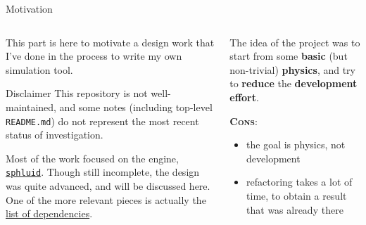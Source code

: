 \documentclass[9pt]{beamer}
\newcommand{\sphluid}{\texttt{sphluid}\xspace}
\begin{document}
\begin{frame}{Motivation}
    \begin{columns}
        \begin{column}{0.5\textwidth}
            This part is here to motivate a design work that I've done in the
            process to write my own simulation tool.

            \vspace*{10pt}
            \begin{center}
            \end{center}


            \vspace*{20pt}
            \begin{alertblock}{Disclaimer}
                This repository is not well-maintained, and some notes
                (including top-level \texttt{README.md}) do not represent the
                most recent status of investigation.

                {\footnotesize
                    Most of the work focused on the engine,
                    \href{https://github.com/AleCandido/sphluid/tree/main/sphluid}{\sphluid}.
                    Though still incomplete, the design was quite advanced, and
                    will be discussed here.
                    One of the more relevant pieces is actually the
                    \href{https://github.com/AleCandido/sphluid/blob/72b9c26eeb969915933ccd50a793b5244255e68a/sphluid/Cargo.toml\#L19-L27}{list
                    of dependencies}.
                }
            \end{alertblock}
        \end{column}
        \begin{column}{0.5\textwidth}
            The idea of the project was to start from some \textbf{basic} (but
            non-trivial) \textbf{physics}, and try to \textbf{reduce} the
            \alert{\textbf{development effort}}.
            \vspace*{30pt}

            \textsc{\color{BrickRed} \textbf{Cons}}:
            \begin{itemize}
                \item the goal is physics, not development
                \item refactoring takes a lot of time, to obtain a result that
                  was already there
            \end{itemize}
            

\end{column}
\end{columns}
\end{frame}
\end{document}
